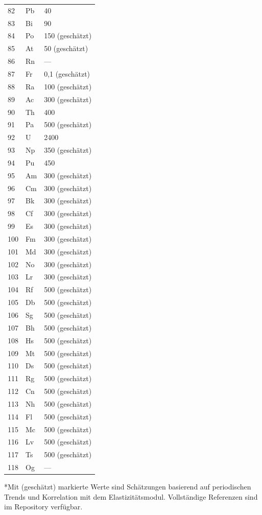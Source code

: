 \documentclass[12pt,a4paper]{article}
\begin{document}
\begin{longtable}{p{0.6cm}p{1.2cm}p{2.5cm}}
		82 & Pb & 40 \\
		83 & Bi & 90 \\
		84 & Po & 150 (geschätzt) \\
		85 & At & 50 (geschätzt) \\
		86 & Rn & — \\
		87 & Fr & 0,1 (geschätzt) \\
		88 & Ra & 100 (geschätzt) \\
		89 & Ac & 300 (geschätzt) \\
		90 & Th & 400 \\
		91 & Pa & 500 (geschätzt) \\
		92 & U  & 2400 \\
		93 & Np & 350 (geschätzt) \\
		94 & Pu & 450 \\
		95 & Am & 300 (geschätzt) \\
		96 & Cm & 300 (geschätzt) \\
		97 & Bk & 300 (geschätzt) \\
		98 & Cf & 300 (geschätzt) \\
		99 & Es & 300 (geschätzt) \\
		100& Fm & 300 (geschätzt) \\
		101& Md & 300 (geschätzt) \\
		102& No & 300 (geschätzt) \\
		103& Lr & 300 (geschätzt) \\
		104& Rf & 500 (geschätzt) \\
		105& Db & 500 (geschätzt) \\
		106& Sg & 500 (geschätzt) \\
		107& Bh & 500 (geschätzt) \\
		108& Hs & 500 (geschätzt) \\
		109& Mt & 500 (geschätzt) \\
		110& Ds & 500 (geschätzt) \\
		111& Rg & 500 (geschätzt) \\
		112& Cn & 500 (geschätzt) \\
		113& Nh & 500 (geschätzt) \\
		114& Fl & 500 (geschätzt) \\
		115& Mc & 500 (geschätzt) \\
		116& Lv & 500 (geschätzt) \\
		117& Ts & 500 (geschätzt) \\
		118& Og & — \\
		\bottomrule
	\end{longtable}
	*Mit (geschätzt) markierte Werte sind Schätzungen basierend auf periodischen Trends und Korrelation mit dem Elastizitätsmodul. Vollständige Referenzen sind im Repository verfügbar.
	
\end{document}
